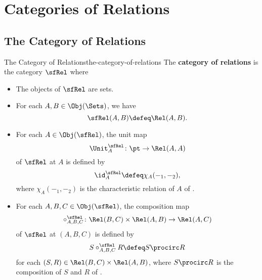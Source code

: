 \section{Categories of Relations}\label{subsection-categories-of-relations}
\subsection{The Category of Relations}\label{subsection-the-category-of-relations}
\begin{definition}{The Category of Relations}{the-category-of-relations}%
    The \textbf{category of relations} is the category $\sfRel$ where
    \begin{itemize}
        \item{}The objects of $\sfRel$ are sets.
        \item{}For each $A,B\in\Obj(\Sets)$, we have
            \[
                \sfRel(A,B)
                \defeq
                \Rel(A,B).
            \]%
        \item{}For each $A\in\Obj(\sfRel)$, the unit map
            \[
                \Unit^{\sfRel}_{A}
                \colon
                \pt
                \to
                \Rel(A,A)
            \]%
            of $\sfRel$ at $A$ is defined by
            \[
                \id^{\sfRel}_{A}
                \defeq
                \chi_{A}(-_{1},-_{2}),
            \]%
            where $\chi_{A}(-_{1},-_{2})$ is the characteristic relation of $A$ of .
        \item{}For each $A,B,C\in\Obj(\sfRel)$, the composition map
            \[
                \circ^{\sfRel}_{A,B,C}%
                \colon%
                \Rel(B,C)%
                \times%
                \Rel(A,B)%
                \to%
                \Rel(A,C)%
            \]%
            of $\sfRel$ at $(A,B,C)$ is defined by%
            \[
                S\mathbin{{\circ}^{\sfRel}_{A,B,C}}R
                \defeq
                S\procirc R
            \]%
            for each $(S,R)\in\Rel(B,C)\times\Rel(A,B)$, where $S\procirc R$ is the composition of $S$ and $R$ of .
    \end{itemize}
\end{definition}
